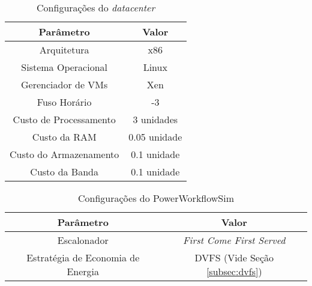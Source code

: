 
\begin{savenotes}
\begin{table}
	\centering
    \begin{tabular}{|c|c|}
    \hline
    \textbf{Parâmetro}     & \textbf{Valor}     \\ \hline
    Arquitetura            & x86          \\
    Sistema Operacional    & Linux        \\
    Gerenciador de VMs     & Xen          \\
    Fuso Horário           & -3           \\
    Custo de Processamento & 3 unidades\footnotemark[3]   \\
    Custo da RAM           & 0.05 unidade\footnotemark[3]  \\
    Custo do Armazenamento & 0.1 unidade\footnotemark[3]  \\
    Custo da Banda         & 0.1 unidade\footnotemark[3]  \\ \hline
    \end{tabular}
    \caption {Configurações do \emph{datacenter}}
    \label{tab:configuracao_datacenter}
\end{table}
\end{savenotes}


\begin{table}
	\centering
    \begin{tabular}{|c|c|}
    \hline
    \textbf{Parâmetro}                & \textbf{Valor}     \\ \hline
    Escalonador                       & \emph{First Come First Served}    \\
    Estratégia de Economia de Energia & DVFS (Vide Seção \ref{subsec:dvfs}) \\ \hline
    \end{tabular}
    \caption {Configurações do PowerWorkflowSim}
    \label{tab:configuracao_powerworkflowsim}
\end{table}


